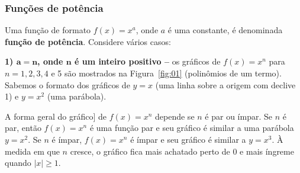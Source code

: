 \vspace{-0.5cm}\begin{figure}[!ht]
	\centering
	\caption{}\label{fig:polinomiais-exemplo1}
\end{figure}
\vspace{-0.7cm}
\exampleEnd
\vspace{-0.7cm}
\subsubsection{Funções de potência}
Uma função de formato $f(x)=x^a$, onde $a$ é uma constante, é denominada \textbf{função de potência}. Considere vários casos:

\noindent \textbf{1) $\boldsymbol{a=n}$, onde $\boldsymbol{n}$ é um inteiro positivo -- } os gráficos de $f(x)=x^n$ para $n=1,2,3,4$ e 5 são mostrados na Figura~\ref{fig:01} (polinômios de um termo). Sabemos o formato dos gráficos de $y=x$ (uma linha sobre a origem com declive 1) e $y=x^2$ (uma parábola).
\vspace{-0.5cm}\begin{figure}[!ht]
	\centering
	\caption{}\label{fig:power-functions}\vspace{-0.3cm}
\end{figure}
A forma geral do gráfico] de $f(x) = x^n$  depende se $n$ é par ou ímpar. Se $n$ é par, então $f(x)=x^n$ é uma função par e seu gráfico é similar a uma parábola $y=x^2$. Se $n$ é ímpar, $f(x)=x^n$ é ímpar e seu gráfico é similar a $y=x^3$. À medida em que $n$ cresce, o gráfico fica mais achatado perto de 0 e mais íngreme quando $|x|\geq 1$. 


